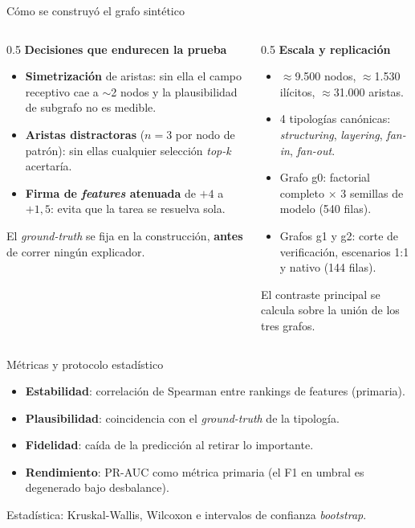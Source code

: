 \documentclass[aspectratio=169,11pt]{beamer}
\begin{document}
\begin{frame}{Cómo se construyó el grafo sintético}
\begin{columns}[T]
\begin{column}{0.5\textwidth}
\footnotesize
\textbf{Decisiones que endurecen la prueba}
\begin{itemize}
  \item \textbf{Simetrización} de aristas: sin ella el campo receptivo cae a $\sim$2 nodos y la plausibilidad de subgrafo no es medible.
  \item \textbf{Aristas distractoras} ($n=3$ por nodo de patrón): sin ellas cualquier selección \textit{top-k} acertaría.
  \item \textbf{Firma de \textit{features} atenuada} de $+4$ a $+1{,}5$: evita que la tarea se resuelva sola.
\end{itemize}
\vspace{3pt}
{\color{muted}El \textit{ground-truth} se fija en la construcción, \textbf{antes} de correr ningún explicador.}
\end{column}
\begin{column}{0.5\textwidth}
\footnotesize
\textbf{Escala y replicación}
\begin{itemize}
  \item $\approx$9.500 nodos, $\approx$1.530 ilícitos, $\approx$31.000 aristas.
  \item 4 tipologías canónicas: \textit{structuring}, \textit{layering}, \textit{fan-in}, \textit{fan-out}.
  \item Grafo g0: factorial completo $\times$ 3 semillas de modelo (540 filas).
  \item Grafos g1 y g2: corte de verificación, escenarios 1:1 y nativo (144 filas).
\end{itemize}
\vspace{3pt}
{\color{muted}El contraste principal se calcula sobre la unión de los tres grafos.}
\end{column}
\end{columns}
\end{frame}

\begin{frame}{Métricas y protocolo estadístico}
\begin{itemize}
  \item \textbf{\color{teal}Estabilidad}: correlación de Spearman entre rankings de features (primaria).
  \item \textbf{\color{seafoam}Plausibilidad}: coincidencia con el \textit{ground-truth} de la tipología.
  \item \textbf{\color{amber}Fidelidad}: caída de la predicción al retirar lo importante.
  \item \textbf{\color{coral}Rendimiento}: PR-AUC como métrica primaria (el F1 en umbral es degenerado bajo desbalance).
\end{itemize}
\vspace{6pt}
\begin{block}{}
\small Estadística: Kruskal-Wallis, Wilcoxon e intervalos de confianza \textit{bootstrap}.
\end{block}
\end{frame}
\end{document}
